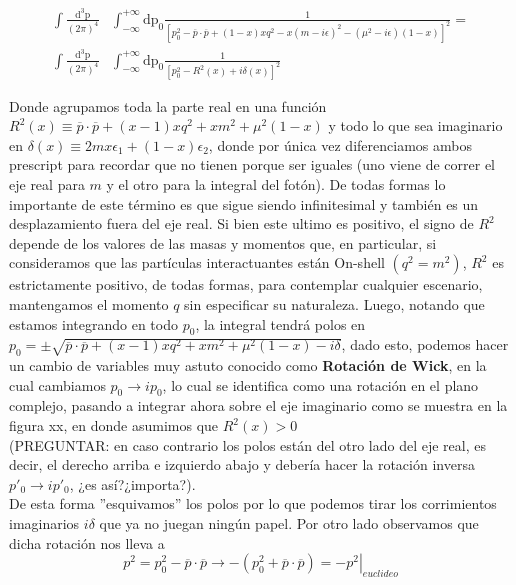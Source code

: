 \documentclass{article}
\numberwithin{equation}{section}
\begin{document}
\begin{equation}
\begin{aligned}
\int\frac{\mathrm{d^{3}p}}{(2\pi)^{4}}&\int_{-\infty}^{+\infty}\mathrm{dp_{0}}\frac{1}{\left[p_{0}^{2}-\overline{p}\cdot\overline{p}+(1-x)xq^{2}-x(m-i\epsilon)^{2}-(\mu^{2}-i\epsilon)(1-x)\right]^{2}}=\\
\int\frac{\mathrm{d^{3}p}}{(2\pi)^{4}}&\int_{-\infty}^{+\infty}\mathrm{dp_{0}}\frac{1}{\left[p_{0}^{2}-R^{2}(x)+i\delta(x)\right]^{2}}
\end{aligned}
\end{equation}

Donde agrupamos toda la parte real en una función $R^{2}(x) \equiv \overline{p}\cdot\overline{p}+(x-1)xq^{2} + x m^{2} + \mu^{2}(1-x) $
y todo lo que sea imaginario en $\delta(x) \equiv 2mx\epsilon_1 + (1-x)\epsilon_2$, donde por única vez diferenciamos ambos prescript para recordar que no tienen porque ser iguales (uno viene de correr el eje real para $ m $ y el otro para la integral del fotón). De todas formas lo importante de este término es que sigue siendo infinitesimal y también es un desplazamiento
fuera del eje real. Si bien este ultimo es positivo, el signo de $R^{2}$
depende de los valores de las masas y momentos que, en particular, si consideramos que las partículas interactuantes están On-shell $(q^2=m^2)  $, $ R^2 $ es estrictamente positivo, de todas formas, para contemplar cualquier escenario, mantengamos el momento $ q $ sin especificar su naturaleza. Luego, notando que estamos integrando en todo $p_{0}$, la integral tendrá polos en
$p_{0}=\pm\sqrt{\overline{p}\cdot\overline{p}+(x-1)xq^{2} + x m^{2} + \mu^{2}(1-x)-i\delta}$, dado esto, podemos hacer un cambio de variables muy astuto conocido
como \textbf{Rotación de Wick}, en la cual cambiamos $p_{0}\rightarrow ip_{0}$, lo cual se identifica como una rotación en el plano complejo, pasando a integrar ahora sobre  el eje imaginario como se muestra en la figura xx, en donde asumimos
que $R^{2}(x)>0$\\

(PREGUNTAR: en caso contrario los polos están del
otro lado del eje real, es decir, el derecho arriba e izquierdo abajo
y debería hacer la rotación inversa $p'_{0}\rightarrow ip'_{0}$,
¿es así?¿importa?).\\

De esta forma ''esquivamos'' los polos por lo que podemos tirar los corrimientos
imaginarios $i\delta$ que ya no juegan ningún papel. Por otro lado
observamos que dicha rotación nos lleva a 
\begin{equation}
p^{2}=p_{0}^{2}-\overline{p}\cdot\overline{p}\rightarrow-\left(p_{0}^{2}+\overline{p}\cdot\overline{p}\right)=\left. -p^{2}\right|_{euclideo}
\end{equation}
\end{document}
